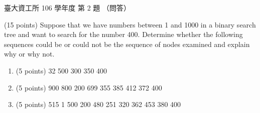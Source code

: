 \begin{pastexam}[label={px:ntu-106-dsa-02}]{臺大資工所 106 學年度 第 2 題}
（問答）

(15 points) Suppose that we have numbers between 1 and 1000 in a binary search tree and want to
search for the number 400. Determine whether the following sequences could be or could not be
the sequence of nodes examined and explain why or why not.
\begin{enumerate}[label=(\alph*)]
\item (5 points) 32 500 300 350 400
\item (5 points) 900 800 200 699 355 385 412 372 400
\item (5 points) 515 1 500 200 480 251 320 362 453 380 400
\end{enumerate}
\end{pastexam}

